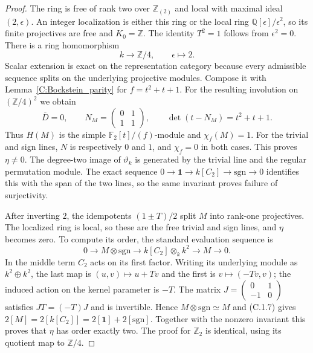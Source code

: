\begin{proof}
The ring is free of rank two over $\mathbb Z_{(2)}$ and local with
maximal ideal $(2,\epsilon)$. An integer localization is either this
ring or the local ring $\mathbb Q[\epsilon]/\epsilon^2$, so its
finite projectives are free and $K_0=\mathbb Z$.
The identity $T^2=1$ follows from $\epsilon^2=0$.
There is a ring homomorphism
\[
 k\longrightarrow\mathbb Z/4,\qquad\epsilon\longmapsto2.
\]
Scalar extension is exact on the representation category because
every admissible sequence splits on the underlying projective
modules. Compose it with Lemma~\ref{C:Bockstein_parity} for
$f=t^2+t+1$.
For the resulting involution on $(\mathbb Z/4)^2$ we obtain
\[
 \overline D=0,\qquad
 N_M=\begin{pmatrix}0&1\\1&1\end{pmatrix},
       \qquad\det(t-N_M)=t^2+t+1.
\]
Thus $H(M)$ is the simple $\mathbb F_2[t]/(f)$-module and
$\chi_f(M)=1$. For the trivial and sign lines, $N$ is respectively
$0$ and $1$, and $\chi_f=0$ in both cases. This proves $\eta\ne0$.
The degree-two image of $\vartheta_k$ is generated by the trivial
line and the regular permutation module. The exact sequence
$0\to\mathbf1\to k[C_2]\to\mathrm{sgn}\to0$ identifies this
with the span of the two lines, so the same invariant proves
failure of surjectivity.

After inverting $2$, the idempotents $(1\pm T)/2$ split $M$ into
rank-one projectives. The localized ring is local, so these are
the free trivial and sign lines, and $\eta$ becomes zero.
To compute its order, the standard evaluation sequence is
\[
 0\longrightarrow M\otimes\mathrm{sgn}
 \longrightarrow k[C_2]\otimes_k k^2
 \longrightarrow M\longrightarrow0.                    \tag{C.1.7}
\]
In the middle term $C_2$ acts on its first factor. Writing its
underlying module as $k^2\oplus k^2$, the last map is
$(u,v)\mapsto u+Tv$ and the first is $v\mapsto(-Tv,v)$;
the induced action on the kernel parameter is $-T$.
The matrix
$J=\left(\begin{smallmatrix}0&1\\-1&0\end{smallmatrix}\right)$
satisfies $JT=(-T)J$ and is invertible. Hence
$M\otimes\mathrm{sgn}\simeq M$ and (C.1.7) gives
$2[M]=2[k[C_2]]=2[\mathbf1]+2[\mathrm{sgn}]$.
Together with the nonzero invariant this proves that $\eta$ has
order exactly two. The proof for $\mathbb Z_2$ is identical, using
its quotient map to $\mathbb Z/4$.
\end{proof}

